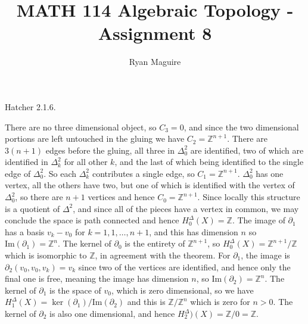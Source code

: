 \documentclass{article}                                                        %
\begin{document}
    \title{MATH 114 Algebraic Topology - Assignment 8}
    \author{Ryan Maguire}
    \date{\vspace{-5ex}}
    \maketitle
    \setcounter{section}{7}
    \begin{problem}
        Hatcher 2.1.6.
    \end{problem}
    \begin{solution}
        There are no three dimensional object, so $C_{3}=0$, and since the two
        dimensional portions are left untouched in the gluing we have
        $C_{2}=\mathbb{Z}^{n+1}$. There are $3(n+1)$ edges before the gluing,
        all three in $\Delta_{0}^{2}$ are identified, two of which are
        identified in $\Delta_{k}^{2}$ for all other $k$, and the last of which
        being identified to the single edge of $\Delta_{0}^{2}$. So each
        $\Delta_{k}^{2}$ contributes a single edge, so $C_{1}=\mathbb{Z}^{n+1}$.
        $\Delta_{0}^{2}$ has one vertex, all the others have two, but one of
        which is identified with the vertex of $\Delta_{0}^{2}$, so there are
        $n+1$ vertices and hence $C_{0}=\mathbb{Z}^{n+1}$. Since locally this
        structure is a quotient of $\Delta^{2}$, and since all of the pieces
        have a vertex in common, we may conclude the space is path connected and
        hence $H_{0}^{\Delta}(X)=\mathbb{Z}$. The image of $\partial_{1}$ has a
        basis $v_{k}-v_{0}$ for $k=1,1,\dots,n+1$, and this has dimension $n$
        so $\textrm{Im}(\partial_{1})=\mathbb{Z}^{n}$. The kernel of
        $\partial_{0}$ is the entirety of $\mathbb{Z}^{n+1}$, so
        $H_{0}^{\Delta}(X)=\mathbb{Z}^{n+1}/\mathbb{Z}$ which is isomorphic to
        $\mathbb{Z}$, in agreement with the theorem. For $\partial_{1}$, the
        image is $\partial_{2}(v_{0},v_{0},v_{k})=v_{k}$ since two of the
        vertices are identified, and hence only the final one is free, meaning
        the image has dimension $n$, so
        $\textrm{Im}(\partial_{2})=\mathbb{Z}^{n}$. The kernel of
        $\partial_{1}$ is the space of $v_{0}$, which is zero dimensional, so we
        have $H_{1}^{\Delta}(X)=\ker(\partial_{1})/\textrm{Im}(\partial_{2})$
        and this is $\mathbb{Z}/\mathbb{Z}^{n}$ which is zero for $n>0$. The
        kernel of $\partial_{2}$ is also one dimensional, and hence
        $H_{2}^{\Delta})(X)=\mathbb{Z}/0=\mathbb{Z}$.
    \end{solution}
\end{document}
